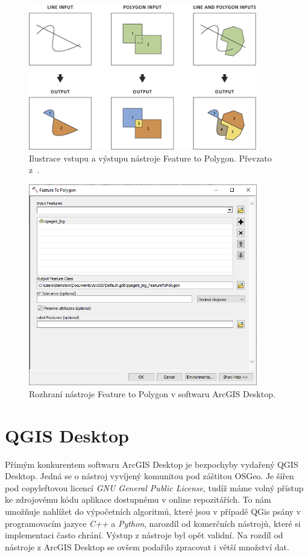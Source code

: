 \begin{figure}[h]
  \centering
  \includegraphics[width=10cm]{./pictures/5_1/feature_to_polygon.png}
  \caption{Ilustrace vstupu a výstupu nástroje Feature to Polygon. Převzato z~\cite{arcgis}.}
  \label{fig:feature_to_polygon}
\end{figure}

\begin{figure}[h]
  \centering
  \includegraphics[width=10cm]{./pictures/5_1/feature_to_polygon-1.png}
  \caption{Rozhraní nástroje Feature to Polygon v softwaru ArcGIS Desktop.}
  \label{fig:feature_to_polygon-1}
\end{figure}


\section{QGIS Desktop}
	Přímým konkurentem softwaru ArcGIS Desktop je bezpochyby vydařený QGIS Desktop. Jedná se o nástroj vyvíjený komunitou pod záštitou OSGeo. Je šířen pod copyleftovou  licencí \textit{GNU General Public License}, tudíž máme volný přístup ke zdrojovému kódu aplikace dostupnému v online repozitářích. To nám umožňuje nahlížet do výpočetních algoritmů, které jsou v případě QGis psány v programovacím jazyce \textit{C++} a \textit{Python}, narozdíl od komerčních nástrojů, které si implementaci často chrání. Výstup z nástroje byl opět validní. Na rozdíl od nástroje z ArcGIS Desktop se ovšem podařilo zpracovat i větší množství dat.

